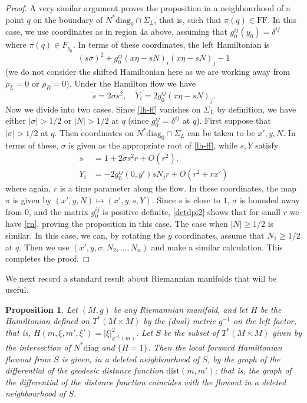 \documentclass[10pt, a4paper, twoside]{amsart}
\numberwithin{equation}{section}
\newtheorem{proposition}[theorem]{Proposition}
\theoremstyle{remark}
\begin{document}
\begin{proof}
A very similar argument proves the proposition in a neighbourhood of a point $q$ on the boundary of $N^* {\mathrm{diag}_0} \cap \Sigma_L$, that is, such that $\pi(q) \in {\mathrm{FF}}$. In this case, we use coordinates as in region 4a above, assuming that $g_0^{ij}(y_0) = \delta^{ij}$ where $\pi(q) \in F_{y_0}$. In terms of these coordinates, the left Hamiltonian is
\begin{equation}
(s\sigma)^2 + g_0^{ij} (x \eta - s N)_i (x \eta - s N)_j  - 1
\label{lh-ff}\end{equation}
(we do not consider the shifted Hamiltonian here as we are working away from $\rho_L = 0$ or $\rho_R = 0$).
Under the Hamilton flow we have
$$
\dot s = 2 \sigma s^2, \quad \dot Y_i = 2g_0^{ij} (x \eta - s N)_j.
$$
Now we divide into two cases. Since \eqref{lh-ff} vanishes on $\Sigma_L$ by definition, we have either $|\sigma| > 1/2$ or $|N| > 1/2$ at $q$ (since $g_0^{ij} = \delta^{ij}$ at $q$). First suppose that $|\sigma| > 1/2$ at $q$. Then coordinates on $N^* {\mathrm{diag}_0} \cap \Sigma_L$ can be taken to be $x', y, N$. In terms of these, $\sigma$ is given as the appropriate root of \eqref{lh-ff}, while $s, Y$ satisfy
\begin{equation}\begin{aligned}
s &= 1 + 2 \sigma s^2 r + O(r^2), \\
Y_i &= -2 g_0^{ij}(0, y') s N_jr + O(r^2 + r x')
\end{aligned}\label{detdpi2}\end{equation}
where again, $r$ is a time parameter along the flow.
In these coordinates, the map $\pi$ is given by $(x', y, N) \mapsto (x', y, s, Y)$.
Since $s$ is close to $1$, $\sigma$ is bounded away from $0$, and  the matrix $g_0^{ij}$ is positive definite, \eqref{detdpi2} shows that for small $r$ we have \eqref{rn}, proving the proposition in this case. The case when $|N| \geq 1/2$ is similar. In this case, we can, by rotating the $y$ coordinates, assume that $N_1 \geq 1/2$ at $q$. Then we use $(x', y, \sigma, N_2, \dots, N_n)$ and make a similar calculation. This completes the proof.
\end{proof}

We next record a standard result about Riemannian manifolds that will be useful. 

\begin{proposition}\label{prop:dist}
Let $(M,g)$ be any Riemannian manifold, and let $H$ be the Hamiltonian defined on $T^*(M \times M)$ by the (dual) metric $g^{-1}$ on the left factor, that is, $H(m, \xi, m', \xi') = |\xi|^2_{g^{-1}(m)}$. Let 
$S$ be the subset of $T^*(M \times M)$ given by the intersection of $N^* {\mathrm{diag}}$ and $\{ H = 1 \}$. Then the local forward Hamiltonian flowout from $S$ is given, in a deleted neighbourhood of $S$, by the graph of the differential of the geodesic distance function ${\mathrm{dist}}(m, m')$; that is, the graph of the differential of the distance function coincides with the flowout in a deleted neighbourhood of $S$. 
\end{proposition}
\end{document}

